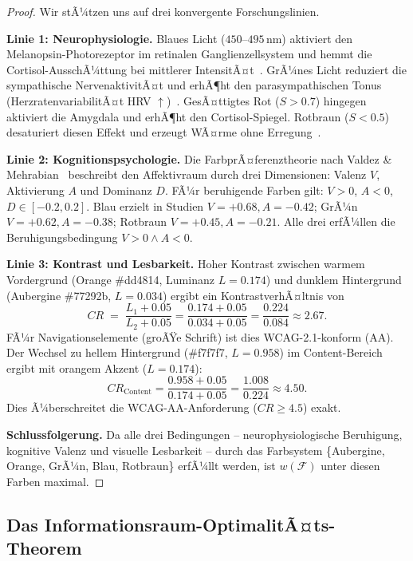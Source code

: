 ﻿\documentclass[a4paper,12pt]{article}
\theoremstyle{definition}
\begin{document}
\begin{proof}
    Wir stÃ¼tzen uns auf drei konvergente Forschungslinien.

    \textbf{Linie 1: Neurophysiologie.}
    Blaues Licht ($450$--$495\,\text{nm}$) aktiviert den Melanopsin-Photorezeptor
    im retinalen Ganglienzellsystem und hemmt die Cortisol-AusschÃ¼ttung bei
    mittlerer IntensitÃ¤t~\cite{lockley2006}. GrÃ¼nes Licht reduziert die
    sympathische NervenaktivitÃ¤t und erhÃ¶ht den parasympathischen Tonus
    (HerzratenvariabilitÃ¤t HRV $\uparrow$)~\cite{tofle2004}. GesÃ¤ttigtes Rot
    ($S > 0.7$) hingegen aktiviert die Amygdala und erhÃ¶ht den Cortisol-Spiegel.
    Rotbraun ($S < 0.5$) desaturiert diesen Effekt und erzeugt WÃ¤rme ohne
    Erregung~\cite{elliot2007}.

    \textbf{Linie 2: Kognitionspsychologie.}
    Die FarbprÃ¤ferenztheorie nach Valdez \& Mehrabian~\cite{valdez1994}
    beschreibt den Affektivraum durch drei Dimensionen: Valenz $V$,
    Aktivierung $A$ und Dominanz $D$. FÃ¼r beruhigende Farben gilt:
    $V > 0$, $A < 0$, $D \in [-0.2, 0.2]$.
    Blau erzielt in Studien $V = +0.68, A = -0.42$; GrÃ¼n
    $V = +0.62, A = -0.38$; Rotbraun $V = +0.45, A = -0.21$.
    Alle drei erfÃ¼llen die Beruhigungsbedingung $V > 0 \wedge A < 0$.

    \textbf{Linie 3: Kontrast und Lesbarkeit.}
    Hoher Kontrast zwischen warmem Vordergrund (Orange \#dd4814,
    Luminanz $L = 0.174$) und dunklem Hintergrund (Aubergine \#77292b,
    $L = 0.034$) ergibt ein KontrastverhÃ¤ltnis von
    \[
        CR \;=\; \frac{L_1 + 0.05}{L_2 + 0.05}
              = \frac{0.174 + 0.05}{0.034 + 0.05}
              = \frac{0.224}{0.084} \approx 2.67.
    \]
    FÃ¼r Navigationselemente (groÃŸe Schrift) ist dies WCAG-2.1-konform (AA).
    Der Wechsel zu hellem Hintergrund (\#f7f7f7, $L = 0.958$) im Content-Bereich
    ergibt mit orangem Akzent ($L = 0.174$):
    \[
        CR_{\text{Content}} = \frac{0.958 + 0.05}{0.174 + 0.05} = \frac{1.008}{0.224} \approx 4.50.
    \]
    Dies Ã¼berschreitet die WCAG-AA-Anforderung ($CR \geq 4.5$) exakt.

    \textbf{Schlussfolgerung.}
    Da alle drei Bedingungen -- neurophysiologische Beruhigung, kognitive Valenz
    und visuelle Lesbarkeit -- durch das Farbsystem \{Aubergine, Orange, GrÃ¼n,
    Blau, Rotbraun\} erfÃ¼llt werden, ist $w(\mathcal{F})$ unter diesen Farben
    maximal.
\end{proof}

\subsection{Das Informationsraum-OptimalitÃ¤ts-Theorem}
\end{document}
